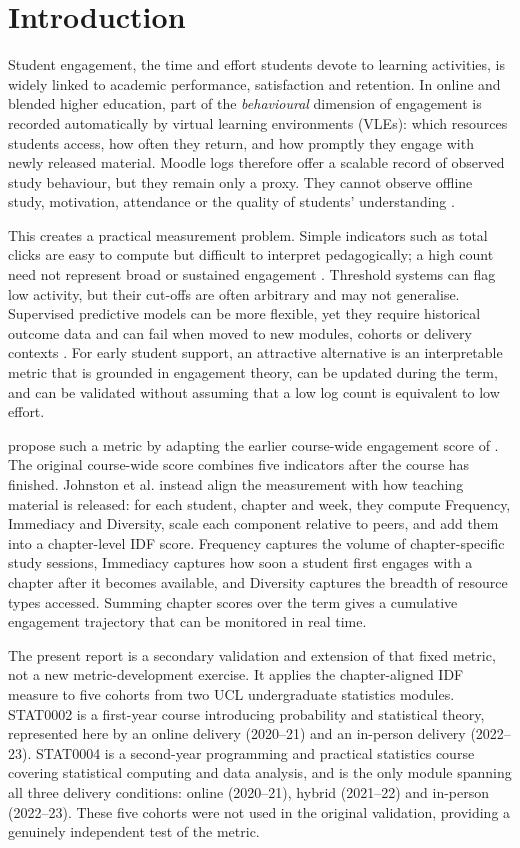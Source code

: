 \documentclass[11pt,a4paper]{article}
\begin{document}
\section{Introduction}
Student engagement, the time and effort students devote to learning
activities, is widely linked to academic performance, satisfaction and
retention. In online and blended higher education, part of the \emph{behavioural}
dimension of engagement is recorded automatically by virtual learning
environments (VLEs): which resources students access, how often they return, and
how promptly they engage with newly released material. Moodle logs therefore
offer a scalable record of observed study behaviour, but they remain only a
proxy. They cannot observe offline study, motivation, attendance or the quality
of students' understanding \citep{henrie2015}.

This creates a practical measurement problem. Simple indicators such as total
clicks are easy to compute but difficult to interpret pedagogically; a high count
need not represent broad or sustained engagement \citep{fincham2019}. Threshold
systems can flag low activity, but their cut-offs are often arbitrary and may not
generalise. Supervised predictive models can be more flexible, yet they require
historical outcome data and can fail when moved to new modules, cohorts or
delivery contexts \citep{gasevic2016}. For early student support, an attractive
alternative is an interpretable metric that is grounded in engagement theory, can
be updated during the term, and can be validated without assuming that a low log
count is equivalent to low effort.

\citet{johnston2025} propose such a metric by adapting the earlier course-wide
engagement score of \citet{chong2019}. The original course-wide score combines
five indicators after the course has finished. Johnston et al. instead align the
measurement with how teaching material is released: for each student, chapter and
week, they compute Frequency, Immediacy and Diversity, scale each component
relative to peers, and add them into a chapter-level IDF score. Frequency captures
the volume of chapter-specific study sessions, Immediacy captures how soon a
student first engages with a chapter after it becomes available, and Diversity
captures the breadth of resource types accessed. Summing chapter scores over the
term gives a cumulative engagement trajectory that can be monitored in real time.

The present report is a secondary validation and extension of that fixed metric,
not a new metric-development exercise. It applies the chapter-aligned IDF measure
to five cohorts from two UCL undergraduate statistics modules. STAT0002 is a
first-year course introducing probability and statistical theory, represented
here by an online delivery (2020--21) and an in-person delivery (2022--23).
STAT0004 is a second-year programming and practical statistics course covering
statistical computing and data analysis, and is the only module spanning all three delivery
conditions: online (2020--21), hybrid (2021--22) and in-person (2022--23). These
five cohorts were not used in the original validation, providing a genuinely
independent test of the metric.
\end{document}
